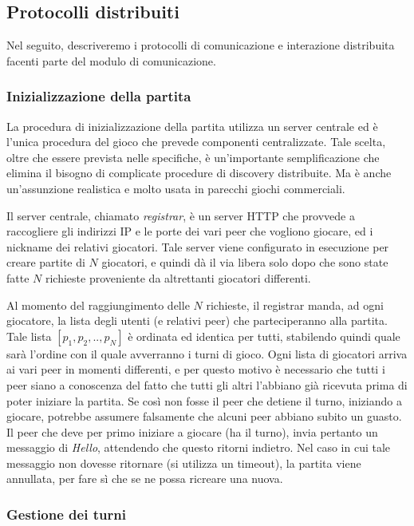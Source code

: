 \documentclass[9pt]{article}
\begin{document}
\subsection{Protocolli distribuiti}
Nel seguito, descriveremo i protocolli di comunicazione e interazione distribuita facenti parte del modulo di comunicazione.

\subsubsection*{Inizializzazione della partita}

La procedura di inizializzazione della partita utilizza un server centrale ed è l'unica procedura del gioco che prevede componenti centralizzate. Tale scelta, oltre che essere prevista nelle specifiche, è un'importante semplificazione che elimina il bisogno di complicate procedure di discovery distribuite. Ma è anche un'assunzione realistica e molto usata in parecchi giochi commerciali.

Il server centrale, chiamato \textit{registrar}, è un server HTTP che provvede a raccogliere gli indirizzi IP e le porte dei vari peer che vogliono giocare, ed i nickname dei relativi giocatori. Tale server viene configurato in esecuzione per creare partite di $N$ giocatori, e quindi dà il via libera solo dopo che sono state fatte $N$ richieste proveniente da altrettanti giocatori differenti.

Al momento del raggiungimento delle $N$ richieste, il registrar manda, ad ogni giocatore, la lista degli utenti (e relativi peer) che parteciperanno alla partita. Tale lista $[p_1, p_2, .., p_N]$ è ordinata ed identica per tutti, stabilendo quindi quale sarà l'ordine con il quale avverranno i turni di gioco. Ogni lista di giocatori arriva ai vari peer in momenti differenti, e per questo motivo è necessario che tutti i peer siano a conoscenza del fatto che tutti gli altri l'abbiano già ricevuta prima di poter iniziare la partita. Se così non fosse il peer che detiene il turno, iniziando a giocare, potrebbe assumere falsamente che alcuni peer abbiano subito un guasto. Il peer che deve per primo iniziare a giocare (ha il turno), invia pertanto un messaggio di \textit{Hello}, attendendo che questo ritorni indietro. Nel caso in cui tale messaggio non dovesse ritornare (si utilizza un timeout), la partita viene annullata, per fare sì che se ne possa ricreare una nuova. 



\subsubsection*{Gestione dei turni}
\end{document}
